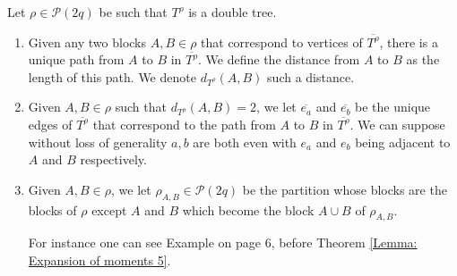 \documentclass[10pt,a4paper]{amsart}
\newcommand{\cP}{\mathcal{P}}
\begin{document}
\begin{notation}\label{Notation: Distance in double tree}
Let $\rho\in \cP(2q)$ be such that $T^\rho$ is a double tree. 
\begin{enumerate}
    \item Given any two blocks $A,B\in \rho$ that correspond to vertices of $\overline{T^\rho}$, there is a unique path from $A$ to $B$ in $\overline{T^\rho}$. We define the distance from $A$ to $B$ as the length of this path. We denote $d_{T^\rho}(A,B)$ such a distance.
    \item Given $A,B\in \rho$ such that $d_{T^\rho}(A,B)=2$, we let $\overline{e_a}$ and $\overline{e_b}$ be the unique edges of $\overline{T^\rho}$ that correspond to the path from $A$ to $B$ in $\overline{T^\rho}$. We can suppose without loss of generality $a,b$ are both even with $e_a$ and $e_b$ being adjacent to $A$ and $B$ respectively.
    \item Given $A,B\in \rho$, we let $\rho_{A,B}\in \cP(2q)$ be the partition whose blocks are the blocks of $\rho$ except $A$ and $B$ which become the block $A\cup B$ of $\rho_{A,B}$. 

For instance one can see Example on page 6, before Theorem \ref{Lemma: Expansion of moments 5}. 
\end{enumerate}
\end{notation}
\end{document}

